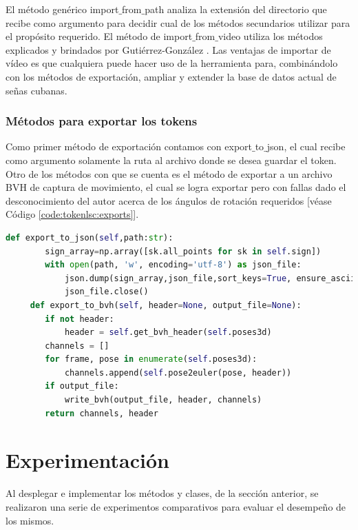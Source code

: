 El método genérico import$\_{}$from$\_{}$path analiza la extensión del directorio que recibe como argumento para decidir cual de los métodos secundarios utilizar para el propósito requerido. El método de import$\_{}$from$\_{}$video utiliza los métodos explicados y brindados por Gutiérrez-González . Las ventajas de importar de vídeo es que cualquiera puede hacer uso de la herramienta para, combinándolo con los métodos de exportación, ampliar y extender la base de datos actual de señas cubanas.

\subsubsection{Métodos para exportar los tokens}

Como primer método de exportación contamos con export$\_{}$to$\_{}$json, el cual recibe como argumento solamente la ruta al archivo donde se desea guardar el token. Otro de los métodos con que se cuenta es el método de exportar a un archivo BVH de captura de movimiento, el cual se logra exportar pero con fallas dado el desconocimiento del autor acerca de los ángulos de rotación requeridos [véase Código \ref{code:tokenlsc:exports}].

\begin{lstlisting}[basicstyle=\tiny,language=Python, caption={Métodos estático para exportar tokens de la clase TokenLSC}, label={code:tokenlsc:exports}] 
 	def export_to_json(self,path:str):
        sign_array=np.array([sk.all_points for sk in self.sign])
        with open(path, 'w', encoding='utf-8') as json_file:
            json.dump(sign_array,json_file,sort_keys=True, ensure_ascii=False)
            json_file.close() 
 	 def export_to_bvh(self, header=None, output_file=None):
        if not header:
            header = self.get_bvh_header(self.poses3d)
        channels = []
        for frame, pose in enumerate(self.poses3d):
            channels.append(self.pose2euler(pose, header))
        if output_file:
            write_bvh(output_file, header, channels)
        return channels, header
\end{lstlisting}

\section{Experimentación}
Al desplegar e implementar los métodos y clases, de la sección anterior, se realizaron una serie de experimentos comparativos para evaluar el desempeño de los mismos.

